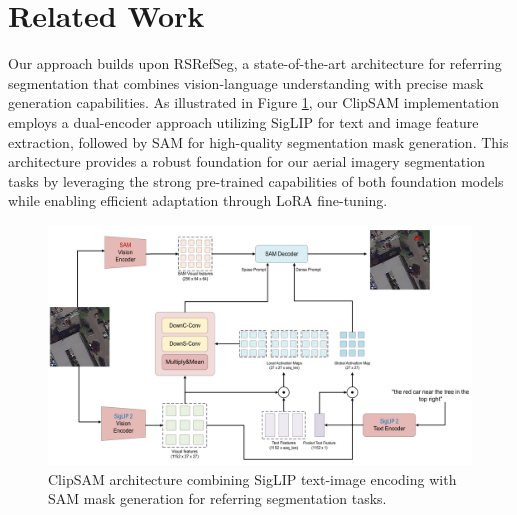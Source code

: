 
\section{Related Work}
\label{sec:related}

Our approach builds upon RSRefSeg, a state-of-the-art architecture for referring segmentation that combines vision-language understanding with precise mask generation capabilities. As illustrated in Figure \ref{fig:clipsam_architecture}, our ClipSAM implementation employs a dual-encoder approach utilizing SigLIP for text and image feature extraction, followed by SAM for high-quality segmentation mask generation. This architecture provides a robust foundation for our aerial imagery segmentation tasks by leveraging the strong pre-trained capabilities of both foundation models while enabling efficient adaptation through LoRA fine-tuning.

\begin{figure}[H]
\centering
\includegraphics[width=\columnwidth]{./images/clipsam.png}
\caption{ClipSAM architecture combining SigLIP text-image encoding with SAM mask generation for referring segmentation tasks.}
\label{fig:clipsam_architecture}
\end{figure}

